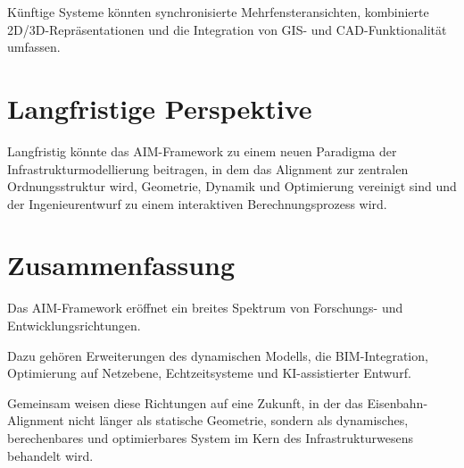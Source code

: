Künftige Systeme könnten synchronisierte Mehrfensteransichten,
kombinierte 2D/3D-Repräsentationen und die Integration von GIS- und
CAD-Funktionalität umfassen.

\section{Langfristige Perspektive}

Langfristig könnte das AIM-Framework zu einem neuen Paradigma der
Infrastrukturmodellierung beitragen, in dem das Alignment zur zentralen
Ordnungsstruktur wird, Geometrie, Dynamik und Optimierung vereinigt sind
und der Ingenieurentwurf zu einem interaktiven Berechnungsprozess wird.

\section{Zusammenfassung}
\begin{summary}
Das AIM-Framework eröffnet ein breites Spektrum von Forschungs- und
Entwicklungsrichtungen.

Dazu gehören Erweiterungen des dynamischen Modells, die BIM-Integration,
Optimierung auf Netzebene, Echtzeitsysteme und KI-assistierter Entwurf.

Gemeinsam weisen diese Richtungen auf eine Zukunft, in der das
Eisenbahn-Alignment nicht länger als statische Geometrie, sondern als
dynamisches, berechenbares und optimierbares System im Kern des
Infrastrukturwesens behandelt wird.
\end{summary}

